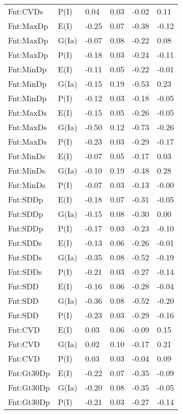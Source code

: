 \begin{center}
\begin{longtable}{|p{1.1in}|p{0.7in}|p{0.7in}|p{0.6in}|p{0.6in}|p{0.6in}|}
  Fnt:CVDs & P(I) & 0.04 & 0.03 & -0.02 & 0.11 \\ 
  Fnt:MaxDp & E(I) & -0.25 & 0.07 & -0.38 & -0.12 \\ 
  Fnt:MaxDp & G(Ia) & -0.07 & 0.08 & -0.22 & 0.08 \\ 
  Fnt:MaxDp & P(I) & -0.18 & 0.03 & -0.24 & -0.11 \\ 
  Fnt:MinDp & E(I) & -0.11 & 0.05 & -0.22 & -0.01 \\ 
  Fnt:MinDp & G(Ia) & -0.15 & 0.19 & -0.53 & 0.23 \\ 
  Fnt:MinDp & P(I) & -0.12 & 0.03 & -0.18 & -0.05 \\ 
  Fnt:MaxDs & E(I) & -0.15 & 0.05 & -0.26 & -0.05 \\ 
  Fnt:MaxDs & G(Ia) & -0.50 & 0.12 & -0.73 & -0.26 \\ 
  Fnt:MaxDs & P(I) & -0.23 & 0.03 & -0.29 & -0.17 \\ 
  Fnt:MinDs & E(I) & -0.07 & 0.05 & -0.17 & 0.03 \\ 
  Fnt:MinDs & G(Ia) & -0.10 & 0.19 & -0.48 & 0.28 \\ 
  Fnt:MinDs & P(I) & -0.07 & 0.03 & -0.13 & -0.00 \\ 
  Fnt:SDDp & E(I) & -0.18 & 0.07 & -0.31 & -0.05 \\ 
  Fnt:SDDp & G(Ia) & -0.15 & 0.08 & -0.30 & 0.00 \\ 
  Fnt:SDDp & P(I) & -0.17 & 0.03 & -0.23 & -0.10 \\ 
  Fnt:SDDs & E(I) & -0.13 & 0.06 & -0.26 & -0.01 \\ 
  Fnt:SDDs & G(Ia) & -0.35 & 0.08 & -0.52 & -0.19 \\ 
  Fnt:SDDs & P(I) & -0.21 & 0.03 & -0.27 & -0.14 \\ 
  Fnt:SDD & E(I) & -0.16 & 0.06 & -0.28 & -0.04 \\ 
  Fnt:SDD & G(Ia) & -0.36 & 0.08 & -0.52 & -0.20 \\ 
  Fnt:SDD & P(I) & -0.23 & 0.03 & -0.29 & -0.16 \\ 
  Fnt:CVD & E(I) & 0.03 & 0.06 & -0.09 & 0.15 \\ 
  Fnt:CVD & G(Ia) & 0.02 & 0.10 & -0.17 & 0.21 \\ 
  Fnt:CVD & P(I) & 0.03 & 0.03 & -0.04 & 0.09 \\ 
  Fnt:Gt30Dp & E(I) & -0.22 & 0.07 & -0.35 & -0.09 \\ 
  Fnt:Gt30Dp & G(Ia) & -0.20 & 0.08 & -0.35 & -0.05 \\ 
  Fnt:Gt30Dp & P(I) & -0.21 & 0.03 & -0.27 & -0.14 \\ 

\end{longtable}
\end{center}
